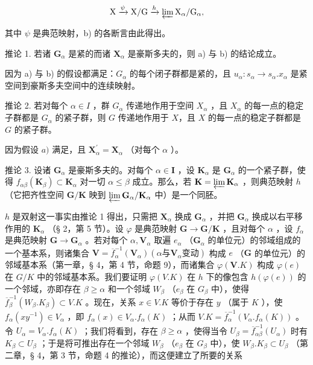 \[
\mathrm{X} \xrightarrow {\psi} \mathrm{X} / \mathrm{G} \xrightarrow {h} \varprojlim \mathrm{X} _ {\alpha} / \mathrm{G} _ {\alpha},
\]

其中 \(\psi\) 是典范映射，b) 的各断言由此得出。

推论 1. 若诸 \(\mathbf{G}_{\alpha}\) 是紧的而诸 \(\mathbf{X}_{\alpha}\) 是豪斯多夫的，则 a) 与 b) 的结论成立。

因为 a) 与 b) 的假设都满足：\(G_{\alpha}\) 的每个闭子群都是紧的，且 \(u_{\alpha}: s_{\alpha} \to s_{\alpha}.x_{\alpha}\) 是紧空间到豪斯多夫空间中的连续映射。

推论 2. 若对每个 \(\alpha \in I\) ，群 \(G_{\alpha}\) 传递地作用于空间 \(X_{\alpha}\) ，且 \(X_{\alpha}\) 的每一点的稳定子群都是 \(G_{\alpha}\) 的紧子群，则 \(G\) 传递地作用于 \(X\)，且 \(X\) 的每一点的稳定子群都是 \(G\) 的紧子群。

因为假设 \(a)\) 满足，且 \(\mathbf{X}_{\alpha}^{\prime} = \mathbf{X}_{\alpha}\) （对每个 \(\alpha\) ）。

推论 3. 设诸 \(\mathbf{G}_{\alpha}\) 是豪斯多夫的。对每个 \(\alpha \in \mathbf{I}\) ，设 \(\mathbf{K}_{\alpha}\) 是 \(\mathbf{G}_{\alpha}\) 的一个紧子群，使得 \(f_{\alpha \beta}(\mathbf{K}_{\beta}) \subset \mathbf{K}_{\alpha}\) 对一切 \(\alpha \leqslant \beta\) 成立。那么，若 \(\mathbf{K} = \varprojlim \mathbf{K}_{\alpha}\) ，则典范映射 \(h\) （它把齐性空间 \(\mathbf{G} / \mathbf{K}\) 映到 \(\varprojlim \mathbf{G}_{\alpha} / \mathbf{K}_{\alpha}\) 中）是一个同胚。

\(h\) 是双射这一事实由推论 1 得出，只需把 \(\mathbf{X}_{\alpha}\) 换成 \(\mathbf{G}_{\alpha}\) ，并把 \(\mathbf{G}_{\alpha}\) 换成以右平移作用的 \(\mathbf{K}_{\alpha}\) （§ 2，第 5 节）。设 \(\varphi\) 是典范映射 \(\mathbf{G} \to \mathbf{G} / \mathbf{K}\) ，且对每个 \(\alpha\) ，设 \(f_{\alpha}\) 是典范映射 \(\mathbf{G} \to \mathbf{G}_{\alpha}\) 。若对每个 \(\alpha, \mathbf{V}_{\alpha}\) 取遍 \(e_{\alpha}\) （\(\mathbf{G}_{\alpha}\) 的单位元）的邻域组成的一个基本系，则诸集合 \(\mathbf{V} = \overline{f}_{\alpha}^{-1}(\mathbf{V}_{\alpha}) (\alpha \text{与} \mathbf{V}_{\alpha} \text{变动})\) 构成 \(e\) （\(\mathbf{G}\) 的单位元）的邻域基本系（第一章，§ 4，第 4 节，命题 9），而诸集合 \(\varphi(\mathbf{V}.K)\) 构成 \(\varphi(e)\) 在 \(G/K\) 中的邻域基本系。我们要证明 \(\varphi(V.K)\) 在 \(h\) 下的像包含 \(h(\varphi(e))\) 的一个邻域，亦即存在 \(\beta \geqslant \alpha\) 和一个邻域 \(W_{\beta}\) （\(e_{\beta}\) 在 \(G_{\beta}\) 中），使得 \(\overline{f}_{\beta}^{-1}(W_{\beta}.K_{\beta}) \subset V.K\) 。现在，关系 \(x \in V.K\) 等价于存在 \(y\) （属于 \(K\) ），使 \(f_{\alpha}(xy^{-1}) \in V_{\alpha}\) ，即 \(f_{\alpha}(x) \in V_{\alpha}.f_{\alpha}(K)\) ；从而 \(V.K = \overline{f}_{\alpha}^{-1}(V_{\alpha}.f_{\alpha}(K))\) 。令 \(U_{\alpha} = V_{\alpha}.f_{\alpha}(K)\) ；我们将看到，存在 \(\beta \geqslant \alpha\) ，使得当令 \(U_{\beta} = \overline{f}_{\alpha\beta}^{-1}(U_{\alpha})\) 时有 \(K_{\beta} \subset U_{\beta}\) ；于是将可推出存在一个邻域 \(W_{\beta}\) （\(e_{\beta}\) 在 \(G_{\beta}\) 中），使 \(W_{\beta}.K_{\beta} \subset U_{\beta}\) （第二章，§ 4，第 3 节，命题 4 的推论），而这便建立了所要的关系

